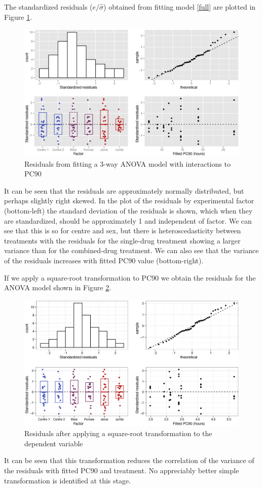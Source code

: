The standardized residuals ($e/\hat{\sigma}$) obtained from fitting model \ref{full} are plotted in Figure \ref{aovloglinres}.
\begin{figure}[h]
\includegraphics[width=6.5in]{aovloglinres.eps} 
\caption{Residuals from fitting a 3-way ANOVA model with interactions to PC90}
\label{aovloglinres}
\end{figure}
It can be seen that the residuals are approximately normally distributed, but perhaps slightly right skewed. In the plot of the residuals by experimental factor (bottom-left) the standard deviation of the residuals is shown, which when they are standardized, should be approximately 1 and independent of factor. We can see that this is so for centre and sex, but there is heteroscedasticity between treatments with the residuals for the single-drug treatment showing a larger variance than for the combined-drug treatment. We can also see that the variance of the residuals increases with fitted PC90 value (bottom-right).

If we apply a square-root transformation to PC90 we obtain the residuals for the ANOVA model shown in Figure \ref{aovsqrtres}.
\begin{figure}[h]
\includegraphics[width=6.5in]{aovsqrtres.eps} 
\caption{Residuals after applying a square-root transformation to the dependent variable}
\label{aovsqrtres}
\end{figure}
It can be seen that this transformation reduces the correlation of the variance of the residuals with fitted PC90 and treatment. No appreciably better simple transformation is identified at this stage.

